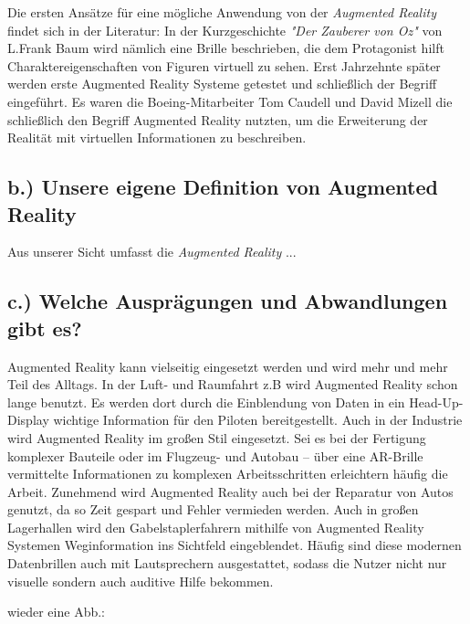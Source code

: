 \documentclass[12pt,utf8]{scrartcl}
\begin{document}
Die ersten Ansätze für eine mögliche Anwendung von der \textit{Augmented Reality} findet sich in der Literatur: In der Kurzgeschichte \textit{"Der Zauberer von Oz"} von L.Frank Baum wird nämlich eine Brille beschrieben, die dem Protagonist hilft Charaktereigenschaften von Figuren virtuell zu sehen.\cite{onlineAR} Erst Jahrzehnte später werden erste Augmented Reality Systeme getestet und schließlich der Begriff eingeführt. Es waren die Boeing-Mitarbeiter Tom Caudell und David Mizell die schließlich den Begriff Augmented Reality nutzten, um die Erweiterung der Realität mit virtuellen Informationen zu beschreiben.\cite{TomDavid}


\subsection{\label{sub2:thema}b.) Unsere eigene Definition von Augmented Reality}

Aus unserer Sicht umfasst die \textit{Augmented Reality} ...

\subsection{\label{sub3:thema}c.) Welche Ausprägungen und Abwandlungen gibt es?}

Augmented Reality kann vielseitig eingesetzt werden und wird mehr und mehr Teil des Alltags. In der Luft- und Raumfahrt z.B wird Augmented Reality schon lange benutzt. Es werden dort durch die Einblendung von Daten in ein Head-Up-Display wichtige Information für den Piloten bereitgestellt. Auch in der Industrie wird Augmented Reality im großen Stil eingesetzt. Sei es bei der Fertigung komplexer Bauteile oder im Flugzeug- und Autobau – über eine AR-Brille vermittelte Informationen zu komplexen Arbeitsschritten erleichtern häufig die Arbeit. Zunehmend wird Augmented Reality auch bei der Reparatur von Autos genutzt, da so Zeit gespart und Fehler vermieden werden. Auch in großen Lagerhallen wird den Gabelstaplerfahrern mithilfe von Augmented Reality Systemen Weginformation ins Sichtfeld eingeblendet. Häufig sind diese modernen Datenbrillen auch mit Lautsprechern ausgestattet, sodass die Nutzer nicht nur visuelle sondern auch auditive Hilfe bekommen.
\linebreak

wieder eine Abb.:
\end{document}
